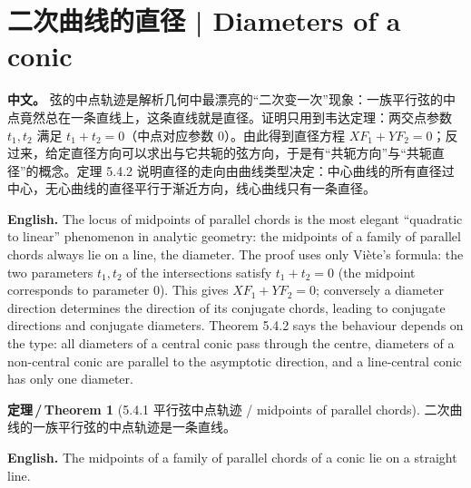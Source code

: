 \documentclass[UTF8,11pt,a4paper]{ctexart}
\newcommand{\APS}[2]{\par\noindent\textbf{中文。} #1\par\noindent\textbf{English.} #2\par\smallskip}
\newcommand{\EN}[1]{\par\noindent \textbf{English.} #1\par}
\theoremstyle{definition}
\newtheorem*{theorem}{定理\,/\,Theorem}
\begin{document}
\section{\label{sec:12}二次曲线的直径 | Diameters of a conic}
\APS{弦的中点轨迹是解析几何中最漂亮的``二次变一次''现象：一族平行弦的中点竟然总在一条直线上，这条直线就是直径。证明只用到韦达定理：两交点参数 $t_1,t_2$ 满足 $t_1+t_2=0$（中点对应参数 $0$）。由此得到直径方程 $XF_1+YF_2=0$；反过来，给定直径方向可以求出与它共轭的弦方向，于是有``共轭方向''与``共轭直径''的概念。定理 5.4.2 说明直径的走向由曲线类型决定：中心曲线的所有直径过中心，无心曲线的直径平行于渐近方向，线心曲线只有一条直径。}{The locus of midpoints of parallel chords is the most elegant ``quadratic to linear'' phenomenon in analytic geometry: the midpoints of a family of parallel chords always lie on a line, the diameter. The proof uses only Viète's formula: the two parameters $t_1,t_2$ of the intersections satisfy $t_1+t_2=0$ (the midpoint corresponds to parameter $0$). This gives $XF_1+YF_2=0$; conversely a diameter direction determines the direction of its conjugate chords, leading to conjugate directions and conjugate diameters. Theorem 5.4.2 says the behaviour depends on the type: all diameters of a central conic pass through the centre, diameters of a non-central conic are parallel to the asymptotic direction, and a line-central conic has only one diameter.}

\begin{theorem}[5.4.1 平行弦中点轨迹 / midpoints of parallel chords]\label{thm:diameter}
二次曲线的一族平行弦的中点轨迹是一条直线。
\EN{The midpoints of a family of parallel chords of a conic lie on a straight line.}
\end{theorem}
\end{document}
